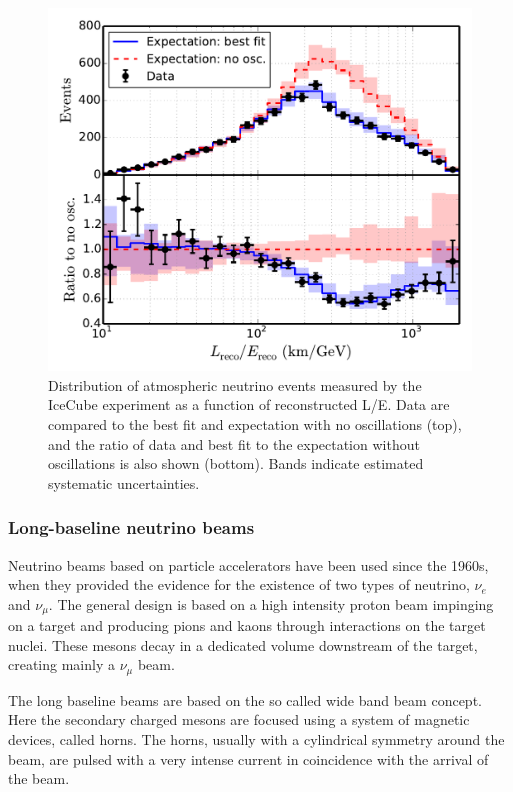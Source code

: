 \documentclass[preprint,12pt]{elsarticle}
\begin{document}
\begin{figure}[htbp]
\centering
\includegraphics[width=0.6\linewidth]{figures/icecube_osc2014_data_mc_LE.pdf}
  \caption{Distribution of atmospheric neutrino events measured by the IceCube experiment\cite{ref:icecubedis} as a function of
reconstructed L/E. Data are compared to the best fit and
expectation with no oscillations (top), and the ratio of data
and best fit to the expectation without oscillations is also shown
(bottom). Bands indicate estimated systematic uncertainties.}
 \label{fig:icecubeosc}
 \end{figure}


\subsubsection{Long-baseline neutrino beams }

Neutrino beams\cite{ref:kopp} based on particle accelerators have been used since the 1960s, when they provided the evidence for the existence of two types of neutrino, $\nu_e$ and $\nu_\mu$. The general design is based on a high intensity proton beam impinging on a target and producing pions and kaons through interactions on the target nuclei. 
These mesons decay in a dedicated volume downstream of the target, creating mainly a $\nu_\mu$ beam.  

The long baseline beams are based on the so called wide band beam concept. Here the secondary charged mesons are focused using a system of magnetic devices, called horns. The horns, usually with a cylindrical symmetry around the beam, are pulsed with a very intense current in coincidence with the arrival of the beam. 
\end{document}
